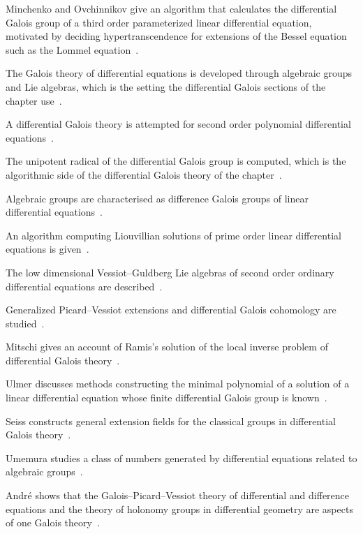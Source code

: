 Minchenko and Ovchinnikov give an algorithm that calculates the differential Galois group of a third order parameterized linear differential equation, motivated by deciding hypertranscendence for extensions of the Bessel equation such as the Lommel equation~\cite{WlCalculatingGaloisGroupsOfThird2018}.

The Galois theory of differential equations is developed through algebraic groups and Lie algebras, which is the setting the differential Galois sections of the chapter use~\cite{WlGaloisTheoryOfDifferentialEqua2020}.

A differential Galois theory is attempted for second order polynomial differential equations~\cite{WlAnAttemptToDifferentialGaloisT2020}.

The unipotent radical of the differential Galois group is computed, which is the algorithmic side of the differential Galois theory of the chapter~\cite{WlComputationOfTheUnipotentRadic2020}.

Algebraic groups are characterised as difference Galois groups of linear differential equations~\cite{WlAlgebraicGroupsAsDifferenceGal2020}.

An algorithm computing Liouvillian solutions of prime order linear differential equations is given~\cite{WlAnAlgorithmToComputeLiouvillia2020}.

The low dimensional Vessiot--Guldberg Lie algebras of second order ordinary differential equations are described~\cite{WlLowDimensionalVessiotGuldbergL2020}.

Generalized Picard--Vessiot extensions and differential Galois cohomology are studied~\cite{WlGeneralizedPicardVessiotExtens2020}.

Mitschi gives an account of Ramis's solution of the local inverse problem of differential Galois theory~\cite{WlOnRamisSSolutionOfTheLocalInve2020}.

Ulmer discusses methods constructing the minimal polynomial of a solution of a linear differential equation whose finite differential Galois group is known~\cite{WlNoteOnAlgebraicSolutionsOfDiff2020}.

Seiss constructs general extension fields for the classical groups in differential Galois theory~\cite{WlOnGeneralExtensionFieldsForThe2020}.

Umemura studies a class of numbers generated by differential equations related to algebraic groups~\cite{WlOnAClassOfNumbersGeneratedByDi2020}.

Andr\'e shows that the Galois--Picard--Vessiot theory of differential and difference equations and the theory of holonomy groups in differential geometry are aspects of one Galois theory~\cite{WlNoncommutativeDifferentialsAnd2020}.

